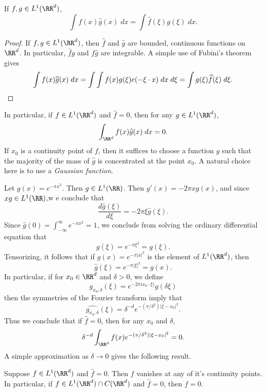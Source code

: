 \begin{theorem}
    If $f,g \in L^1(\RR^d)$,
    \[ \int f(x) \widehat{g}(x)\; dx = \int \widehat{f}(\xi) g(\xi)\; dx. \]
\end{theorem}
\begin{proof}
    If $f, g \in L^1(\RR^d)$, then $\widehat{f}$ and $\widehat{g}$ are bounded, continuous functions on $\RR^d$. In particular, $\widehat{f} g$ and $f \widehat{g}$ are integrable. A simple use of Fubini's theorem gives
    \[ \int f(x) \widehat{g}(x)\; dx = \int \int f(x) g(\xi) e(- \xi \cdot x)\; dx\; d\xi = \int g(\xi) \widehat{f}(\xi)\; d\xi. \qedhere \]
\end{proof}

In particular, if $f \in L^1(\RR^d)$ and $\widehat{f} = 0$, then for any $g \in L^1(\RR^d)$,
%
\[ \int_{\RR^d} f(x) \widehat{g}(x)\; dx = 0. \]
%
If $x_0$ is a continuity point of $f$, then it suffices to choose a function $g$ such that the majority of the mass of $\widehat{g}$ is concentrated at the point $x_0$. A natural choice here is to use a \emph{Gaussian function}.

Let $g(x) = e^{- \pi x^2}$. Then $g \in L^1(\RR)$. Then $g'(x) = - 2 \pi x g(x)$, and since $x g \in L^1(\RR)$,w e conclude that
%
\[ \frac{d \widehat{g}(\xi)}{d\xi} = - 2 \pi \xi \widehat{g}(\xi). \]
%
Since $\widehat{g}(0) = \int_{-\infty}^\infty e^{- \pi x^2} = 1$, we conclude from solving the ordinary differential equation that
%
\[ \widehat{g}(\xi) = e^{- \pi \xi^2} = g(\xi). \]
%
Tensorizing, it follows that if $g(x) = e^{-\pi |x|^2}$ is the element of $L^1(\RR^d)$, then
%
\[ \widehat{g}(\xi) = e^{- \pi |\xi|^2} = g(x). \]
%
In particular, if for $x_0 \in \RR^d$ and $\delta > 0$, we define
%
\[ g_{x_0,\delta}(\xi) = e^{- 2 \pi i x_0 \cdot \xi)} g(\delta \xi) \]
%
then the symmetries of the Fourier transform imply that
%
\[ \widehat{g_{x_0,\delta}}(\xi) = \delta^{-d} e^{-(\pi/\delta^2) |\xi - x_0|^2}. \]
%
Thus we conclude that if $\widehat{f} = 0$, then for any $x_0$ and $\delta$,
%
\[ \delta^{-d} \int_{\RR^d} f(x) e^{-(\pi/\delta^2) |\xi - x_0|^2} = 0. \]
%
A simple approximation as $\delta \to 0$ gives the following result.

\begin{theorem}
    Suppose $f \in L^1(\RR^d)$ and $\widehat{f} = 0$. Then $f$ vanishes at any of it's continuity points. In particular, if $f \in L^1(\RR^d) \cap C(\RR^d)$ and $\widehat{f} = 0$, then $f = 0$.
\end{theorem}


